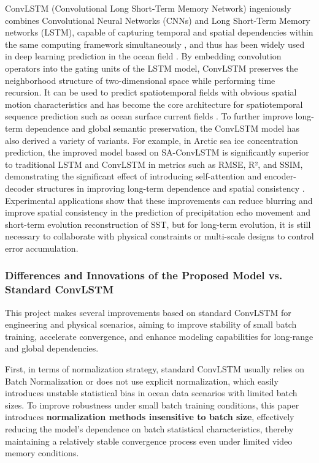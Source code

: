 \documentclass[webpdf,contemporary,large]{oup-authoring-template}
\begin{document}
ConvLSTM (Convolutional Long Short-Term Memory Network) ingeniously combines Convolutional Neural Networks (CNNs) and Long Short-Term Memory networks (LSTM), capable of capturing temporal and spatial dependencies within the same computing framework simultaneously \cite{shiSeaSurfaceTemperature2024}, and thus has been widely used in deep learning prediction in the ocean field \cite{shiConvolutionalLSTMNetwork2015}. By embedding convolution operators into the gating units of the LSTM model, ConvLSTM preserves the neighborhood structure of two-dimensional space while performing time recursion. It can be used to predict spatiotemporal fields with obvious spatial motion characteristics and has become the core architecture for spatiotemporal sequence prediction such as ocean surface current fields \cite{t.s.rajarajeswariSpatiotemporalForecastingOcean2025a}. To further improve long-term dependence and global semantic preservation, the ConvLSTM model has also derived a variety of variants. For example, in Arctic sea ice concentration prediction, the improved model based on SA-ConvLSTM is significantly superior to traditional LSTM and ConvLSTM in metrics such as RMSE, R², and SSIM, demonstrating the significant effect of introducing self-attention and encoder-decoder structures in improving long-term dependence and spatial consistency \cite{ZhaoXiangYuYiZhongJiYuGaiJinDeSAConvLSTMMoXingDeBeiJiYueJunHaiBingMiJiDuShiKongYuCeFangFa2025}. Experimental applications show that these improvements can reduce blurring and improve spatial consistency in the prediction of precipitation echo movement and short-term evolution reconstruction of SST, but for long-term evolution, it is still necessary to collaborate with physical constraints or multi-scale designs to control error accumulation.

\subsubsection{Differences and Innovations of the Proposed Model vs. Standard ConvLSTM}

This project makes several improvements based on standard ConvLSTM for engineering and physical scenarios, aiming to improve stability of small batch training, accelerate convergence, and enhance modeling capabilities for long-range and global dependencies.

First, in terms of normalization strategy, standard ConvLSTM usually relies on Batch Normalization or does not use explicit normalization, which easily introduces unstable statistical bias in ocean data scenarios with limited batch sizes. To improve robustness under small batch training conditions, this paper introduces \textbf{normalization methods insensitive to batch size}, effectively reducing the model's dependence on batch statistical characteristics, thereby maintaining a relatively stable convergence process even under limited video memory conditions.
\end{document}
